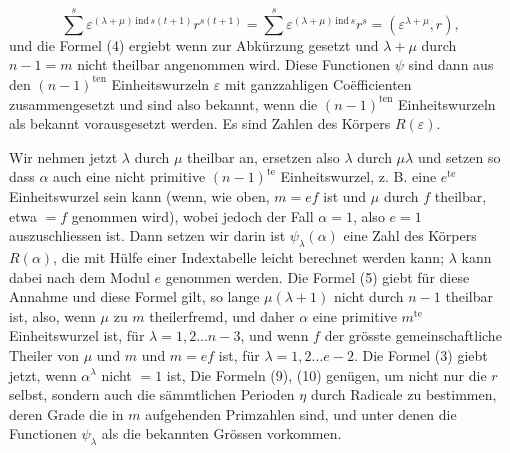 \[ \sum^{s} \varepsilon^{(\lambda+\mu)\,\mathrm{ind}\,s(t+1)} r^{s(t+1)} = \sum^{s} \varepsilon^{(\lambda+\mu)\,\mathrm{ind}\,s} r^s = (\varepsilon^{\lambda+\mu}, r), \]
und die Formel (4) ergiebt
wenn zur Abk\"urzung
gesetzt und $\lambda + \mu$ durch $n - 1 = m$ nicht theilbar angenommen
wird. Diese Functionen $\psi$ sind dann aus den $(n-1)^{\mathrm{ten}}$ Einheitswurzeln
 $\varepsilon$ mit ganzzahligen Co\"efficienten zusammengesetzt und
sind also bekannt, wenn die $(n-1)^{\mathrm{ten}}$ Einheitswurzeln als bekannt
 vorausgesetzt werden. Es sind Zahlen des K\"orpers $R(\varepsilon)$.

Wir nehmen jetzt $\lambda$ durch $\mu$ theilbar an, ersetzen also $\lambda$
durch $\mu\lambda$ und setzen
so dass $\alpha$ auch eine nicht primitive $(n-1)^{\mathrm{te}}$ Einheitswurzel,
z. B. eine $e^{\mathrm{te}}$ Einheitswurzel sein kann (wenn, wie oben, $m = ef$
ist und $\mu$ durch $f$ theilbar, etwa $= f$ genommen wird), wobei
jedoch der Fall $\alpha = 1$, also $e = 1$ auszuschliessen ist.
Dann setzen wir
darin ist $\psi_\lambda(\alpha)$ eine Zahl des K\"orpers $R(\alpha)$, die mit H\"ulfe einer
Indextabelle leicht berechnet werden kann; $\lambda$ kann dabei nach
dem Modul $e$ genommen werden. Die Formel (5) giebt f\"ur diese
Annahme
und diese Formel gilt, so lange $\mu(\lambda+1)$ nicht durch $n - 1$
theilbar ist, also, wenn $\mu$ zu $m$ theilerfremd, und daher $\alpha$ eine
primitive $m^{\mathrm{te}}$ Einheitswurzel ist, f\"ur $\lambda = 1, 2 \ldots n-3$, und
wenn $f$ der gr\"osste gemeinschaftliche Theiler von $\mu$ und $m$ und
$m = ef$ ist, f\"ur $\lambda = 1, 2 \ldots e-2$.
Die Formel (3) giebt jetzt, wenn $\alpha^\lambda$ nicht $= 1$ ist,
Die Formeln (9), (10) gen\"ugen, um nicht nur die $r$ selbst,
sondern auch die s\"ammtlichen Perioden $\eta$ durch Radicale zu
bestimmen, deren Grade die in $m$ aufgehenden Primzahlen sind,
und unter denen die Functionen $\psi_\lambda$ als die bekannten Gr\"ossen
vorkommen.
